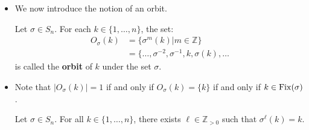 \begin{itemize}
\begin{proof}
        For the first case, suppose $k\in \fix(\sigma) \cap \fix(\tau)$. Then $\sigma(k)=k=\tau(k).$ Therefore:
        \begin{equation}
            \sigma\tau(k)=\sigma(k)=k
        \end{equation}
        and:
        \begin{equation}
            \tau\sigma(k)=\tau(k)=k
        \end{equation}
        so $\sigma\tau(k)=\tau\sigma(k)$.
        
        For the second case, suppose $k\notin \fix(\sigma)$. Since $\sigma$ and $\tau$ are disjoint, we have $k\in \fix(\tau)$. Therefore $\tau(k)=k$ and $\sigma\tau(k)=\sigma(k)$. Since $k\notin \fix(\sigma)$, we have $\sigma(k)\notin \fix(\sigma)$ by part (2) of the above lemma. Since $\sigma$ and $\tau$ are disjoint and $\sigma(k) \notin \fix(\sigma)$, we have $\sigma \in \fix(\tau)$.

        Therefore, $\tau\sigma(k)=\sigma(k)$. As a result:
        \begin{equation}
            \tau\sigma(k)=\sigma\tau(k)
        \end{equation}

        For the last case, we consider $k\notin \fix(\tau)$. It can be handled in the same way as the second case.
    \end{proof}
    \item We now introduce the notion of an orbit.
    \begin{definition}
        Let $\sigma\in S_n$. For each $k\in\{1,\dots,n\}$, the set:
        \begin{align}
            O_{\sigma}(k) &= \{\sigma^m(k) | m \in \mathbb{Z}\} \\
            &= \{\dots,\sigma^{-2},\sigma^{-1},k,\sigma(k),\dots 
        \end{align}
        is called the \textbf{orbit} of $k$ under the set $\sigma$.
    \end{definition}
    \item Note that $|O_\sigma(k)|=1$ if and only if $O_{\sigma}(k) = \{k\}$ if and only if $k\in \operatorname{Fix}(\sigma)$.
    \begin{proposition}
        Let $\sigma\in S_n$. For all $k\in \{1,\dots,n\}$, there exists $\ell \in \mathbb{Z}_{>0}$ such that $\sigma^{\ell}(k)=k$.
        \vspace{2mm}
        

\end{proposition}
\end{itemize}
